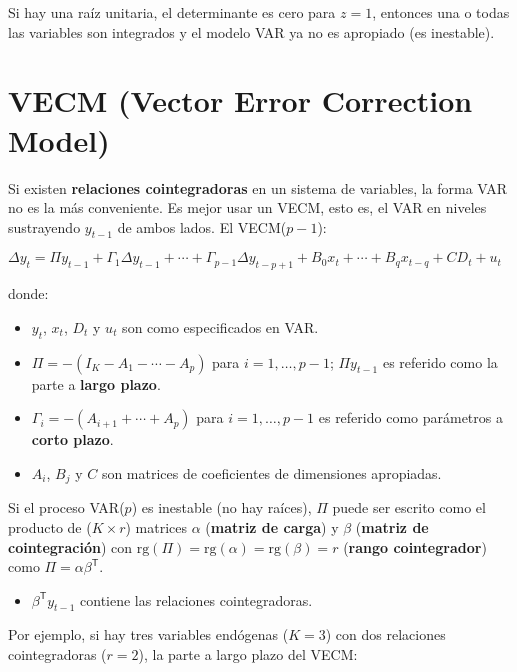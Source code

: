 \documentclass[10pt, a4paper, landscape]{article}
\newcommand{\tr}{\mathsf{T}}
\newcommand{\rk}{\mathrm{rg}}
\begin{document}
\begin{multicols}{2}
		Si hay una raíz unitaria, el determinante es cero para $z = 1$, entonces una o todas las variables son integrados y el modelo VAR ya no es apropiado (es inestable).
		
		\columnbreak
		
		\section*{VECM (Vector Error Correction Model)}
		
		Si existen \textbf{relaciones cointegradoras} en un sistema de variables, la forma VAR no es la más conveniente. Es mejor usar un VECM, esto es, el VAR en niveles sustrayendo $y_{t - 1}$ de ambos lados. El VECM($p - 1$):
		
		\begin{center}
			$\Delta y_{t} = \Pi y_{t - 1} + \Gamma_{1} \Delta y_{t - 1} + \cdots + \Gamma_{p - 1} \Delta y_{t - p + 1} + B_{0} x_{t} + \cdots + B_{q} x_{t - q} + CD_{t} + u_{t}$
		\end{center}
		
		donde:
		
		\begin{itemize}[leftmargin=*]
			\item $y_{t}$, $x_{t}$, $D_{t}$ y $u_{t}$ son como especificados en VAR.
			\item $\Pi = - (I_{K} - A_{1} - \cdots - A_{p})$ para $i = 1, \ldots, p - 1$; $\Pi y_{t - 1}$ es referido como la parte a \textbf{largo plazo}.
			\item $\Gamma_{i} = - (A_{i + 1} + \cdots + A_{p})$ para $i = 1, \ldots, p - 1$ es referido como parámetros a \textbf{corto plazo}.
			\item $A_{i}$, $B_{j}$ y $C$ son matrices de coeficientes de dimensiones apropiadas.
		\end{itemize}
		
		Si el proceso VAR($p$) es inestable (no hay raíces), $\Pi$ puede ser escrito como el producto de ($K \times r$) matrices $\alpha$ (\textbf{matriz de carga}) y $\beta$ (\textbf{matriz de cointegración}) con $\rk(\Pi) = \rk(\alpha) = \rk(\beta) = r$ (\textbf{rango cointegrador}) como $\Pi = \alpha \beta^{\tr}$.
		
		\begin{itemize}[leftmargin=*]
			\item $\beta^{\tr} y_{t - 1}$ contiene las relaciones cointegradoras.
		\end{itemize}
		
		Por ejemplo, si hay tres variables endógenas ($K = 3$) con dos relaciones cointegradoras ($r = 2$), la parte a largo plazo del VECM:
		

\end{multicols}
\end{document}
